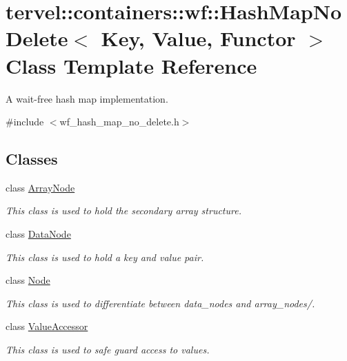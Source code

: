 \hypertarget{classtervel_1_1containers_1_1wf_1_1_hash_map_no_delete}{}\section{tervel\+:\+:containers\+:\+:wf\+:\+:Hash\+Map\+No\+Delete$<$ Key, Value, Functor $>$ Class Template Reference}
\label{classtervel_1_1containers_1_1wf_1_1_hash_map_no_delete}


A wait-\/free hash map implementation.  




{\ttfamily \#include $<$wf\+\_\+hash\+\_\+map\+\_\+no\+\_\+delete.\+h$>$}

\subsection*{Classes}
\begin{DoxyCompactItemize}
\item 
class \hyperlink{classtervel_1_1containers_1_1wf_1_1_hash_map_no_delete_1_1_array_node}{Array\+Node}
\begin{DoxyCompactList}\small\item\em This class is used to hold the secondary array structure. \end{DoxyCompactList}\item 
class \hyperlink{classtervel_1_1containers_1_1wf_1_1_hash_map_no_delete_1_1_data_node}{Data\+Node}
\begin{DoxyCompactList}\small\item\em This class is used to hold a key and value pair. \end{DoxyCompactList}\item 
class \hyperlink{classtervel_1_1containers_1_1wf_1_1_hash_map_no_delete_1_1_node}{Node}
\begin{DoxyCompactList}\small\item\em This class is used to differentiate between data\+\_\+nodes and array\+\_\+nodes/. \end{DoxyCompactList}\item 
class \hyperlink{classtervel_1_1containers_1_1wf_1_1_hash_map_no_delete_1_1_value_accessor}{Value\+Accessor}
\begin{DoxyCompactList}\small\item\em This class is used to safe guard access to values. \end{DoxyCompactList}\end{DoxyCompactItemize}
